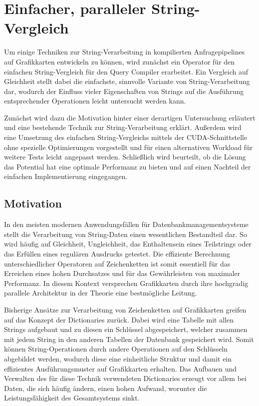 \chapter{Einfacher, paralleler String-Vergleich}

Um einige Techniken zur String-Verarbeitung in kompilierten Anfragepipelines auf Grafikkarten entwickeln zu können, wird zunächst ein Operator für den einfachen String-Vergleich für den Query Compiler erarbeitet.
Ein Vergleich auf Gleichheit stellt dabei die einfachste, sinnvolle Variante von String-Verarbeitung dar, wodurch der Einfluss vieler Eigenschaften von Strings auf die Ausführung entsprechender Operationen leicht untersucht werden kann.

Zunächst wird dazu die Motivation hinter einer derartigen Untersuchung erläutert und eine bestehende Technik zur String-Verarbeitung erklärt.
Außerdem wird eine Umsetzung des einfachen String-Vergleichs mittels der CUDA-Schnittstelle ohne spezielle Optimierungen vorgestellt und für einen alternativen Workload für weitere Tests leicht angepasst werden.
Schließlich wird beurteilt, ob die Lösung das Potential hat eine optimale Performanz zu bieten und auf einen Nachteil der einfachen Implementierung eingegangen.

\section{Motivation}

In den meisten modernen Anwendungsfällen für Datenbankmanagementsysteme stellt die Verarbeitung von String-Daten einen wesentlichen Bestandteil dar.
So wird häufig auf Gleichheit, Ungleichheit, das Enthaltensein eines Teilstrings oder das Erfüllen eines regulären Ausdrucks getestet.
Die effiziente Berechnung unterschiedlicher Operatoren auf Zeichenketten ist somit essentiell für das Erreichen eines hohen Durchsatzes und für das Gewährleisten von maximaler Performanz.
In diesem Kontext versprechen Grafikkarten durch ihre hochgradig parallele Architektur in der Theorie eine bestmögliche Leitung.

Bisherige Ansätze zur Verarbeitung von Zeichenketten auf Grafikkarten greifen auf das Konzept der Dictionaries zurück.
Dabei wird eine Tabelle mit allen Strings aufgebaut und zu diesen ein Schlüssel abgespeichert, welcher zusammen mit jedem String in den anderen Tabellen der Datenbank gespeichert wird.
Somit können String-Operationen durch andere Operationen auf den Schlüsseln abgebildet werden, wodurch diese eine einheitliche Struktur und damit ein effizientes Ausführungsmuster auf Grafikkarten erhalten.
Das Aufbauen und Verwalten des für diese Technik verwendeten Dictionaries erzeugt vor allem bei Daten, die sich häufig ändern, einen hohen Aufwand, worunter die Leistungsfähigkeit des Gesamtsystems sinkt.

